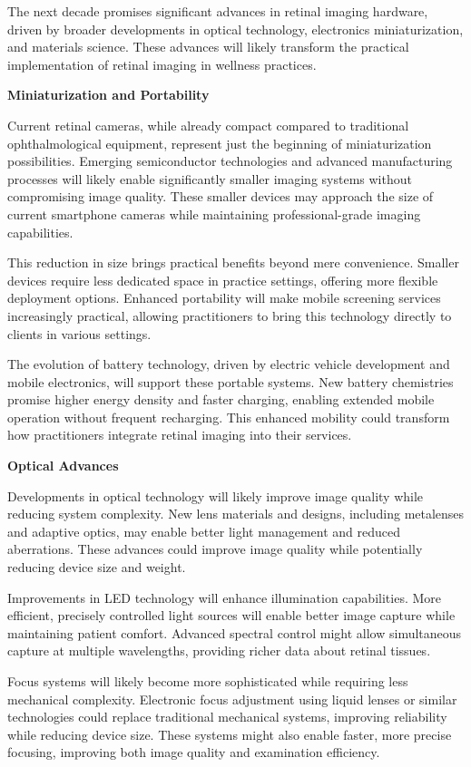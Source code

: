 \documentclass[
  Letterpaper,
]{scrbook}
\begin{document}
The next decade promises significant advances in retinal imaging
hardware, driven by broader developments in optical technology,
electronics miniaturization, and materials science. These advances will
likely transform the practical implementation of retinal imaging in
wellness practices.

\textbf{Miniaturization and Portability}

Current retinal cameras, while already compact compared to traditional
ophthalmological equipment, represent just the beginning of
miniaturization possibilities. Emerging semiconductor technologies and
advanced manufacturing processes will likely enable significantly
smaller imaging systems without compromising image quality. These
smaller devices may approach the size of current smartphone cameras
while maintaining professional-grade imaging capabilities.

This reduction in size brings practical benefits beyond mere
convenience. Smaller devices require less dedicated space in practice
settings, offering more flexible deployment options. Enhanced
portability will make mobile screening services increasingly practical,
allowing practitioners to bring this technology directly to clients in
various settings.

The evolution of battery technology, driven by electric vehicle
development and mobile electronics, will support these portable systems.
New battery chemistries promise higher energy density and faster
charging, enabling extended mobile operation without frequent
recharging. This enhanced mobility could transform how practitioners
integrate retinal imaging into their services.

\textbf{Optical Advances}

Developments in optical technology will likely improve image quality
while reducing system complexity. New lens materials and designs,
including metalenses and adaptive optics, may enable better light
management and reduced aberrations. These advances could improve image
quality while potentially reducing device size and weight.

Improvements in LED technology will enhance illumination capabilities.
More efficient, precisely controlled light sources will enable better
image capture while maintaining patient comfort. Advanced spectral
control might allow simultaneous capture at multiple wavelengths,
providing richer data about retinal tissues.

Focus systems will likely become more sophisticated while requiring less
mechanical complexity. Electronic focus adjustment using liquid lenses
or similar technologies could replace traditional mechanical systems,
improving reliability while reducing device size. These systems might
also enable faster, more precise focusing, improving both image quality
and examination efficiency.
\end{document}
